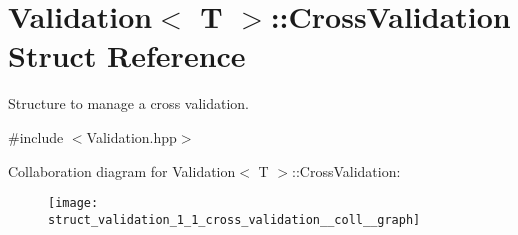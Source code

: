 \hypertarget{struct_validation_1_1_cross_validation}{}\section{Validation$<$ T $>$\+:\+:Cross\+Validation Struct Reference}
\label{struct_validation_1_1_cross_validation}


Structure to manage a cross validation.  




{\ttfamily \#include $<$Validation.\+hpp$>$}



Collaboration diagram for Validation$<$ T $>$\+:\+:Cross\+Validation\+:
\nopagebreak
\begin{figure}[H]
\begin{center}
\leavevmode
\texttt{[image: struct\_validation\_1\_1\_cross\_validation\_\_coll\_\_graph]}
\end{center}
\end{figure}
